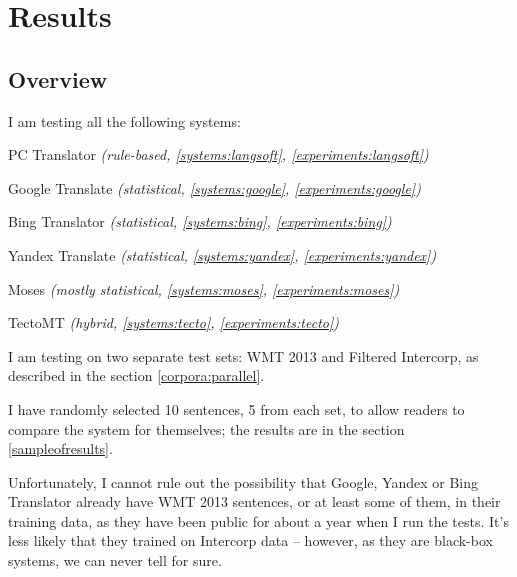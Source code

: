 \chapter{Results}
\label{chapter:results}

\section{Overview}
\label{overvieweval}
I am testing all the following systems:
\begin{pitemize}
\item PC Translator \emph{(rule-based, \ref{systems:langsoft}, \ref{experiments:langsoft})}
\item Google Translate \emph{(statistical, \ref{systems:google}, \ref{experiments:google})}
\item Bing Translator \emph{(statistical, \ref{systems:bing}, \ref{experiments:bing})}
\item Yandex Translate \emph{(statistical, \ref{systems:yandex}, \ref{experiments:yandex})}
\item Moses \emph{(mostly statistical, \ref{systems:moses}, \ref{experiments:moses})}
\item TectoMT \emph{(hybrid, \ref{systems:tecto}, \ref{experiments:tecto})}
\end{pitemize}

I am testing on two separate test sets: WMT 2013 and Filtered Intercorp, as described in the section \ref{corpora:parallel}.

I have randomly selected 10 sentences, 5 from each set, to allow readers to compare the system for themselves; the results are in the section \ref{sampleofresults}.

Unfortunately, I cannot rule out the possibility that Google, Yandex or Bing Translator already have WMT 2013 sentences, or at least some of them, in their training data, as they have been public for about a year when I run the tests. It's less likely that they trained on Intercorp data -- however, as they are black-box systems, we can never tell for sure.



